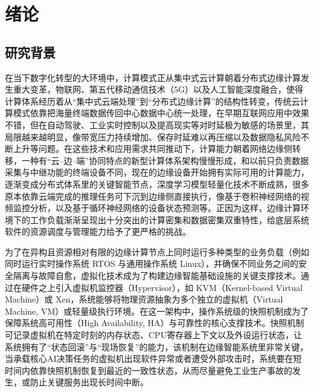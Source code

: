 

\chapter{绪论}

\section{研究背景}

在当下数字化转型的大环境中，计算模式正从集中式云计算朝着分布式边缘计算发生重大变革\cite{hamdaqa2012cloud, shi2022memory}，物联网、第五代移动通信技术（5G）以及人工智能深度融合，使得计算体系经历着从“集中式云端处理”到“分布式边缘计算”的结构性转变，传统云计算模式依靠把海量终端数据传回中心数据中心统一处理，在早期互联网应用中效果不错，但在自动驾驶、工业实时控制以及提高现实等对时延极为敏感的场景里，其局限越来越明显，像带宽压力持续增加、保存时延难以再压缩以及数据隐私风险不断上升等问题\cite{zhang2023review}。在这些技术和应用需求共同推动下，计算能力朝着网络边缘侧转移，一种有“云–边–端”协同特点的新型计算体系架构慢慢形成，和以前只负责数据采集与中继功能的终端设备不同，现在的边缘设备开始拥有实际可用的计算能力，逐渐变成分布式体系里的关键智能节点\cite{shi2022memory}，深度学习模型轻量化技术不断成熟，很多原本依靠云端完成的推理任务可下沉到边缘侧直接执行，像基于卷积神经网络的视频监控分析，以及基于循环神经网络的设备状态预测等。正因为这样，边缘计算环境下的工作负载渐渐呈现出十分突出的计算密集和数据密集双重特性，给底层系统软件的资源调度与管理能力给予了更严格的挑战。

为了在异构且资源相对有限的边缘计算节点上同时运行多种类型的业务负载（例如同时运行实时操作系统 RTOS 与通用操作系统 Linux），并确保不同业务之间的安全隔离与故障自愈，虚拟化技术成为了构建边缘智能基础设施的关键支撑技术\cite{heiser2008role, aguiar2010embedded}。通过在硬件之上引入虚拟机监控器（Hypervisor），如 KVM（Kernel-based Virtual Machine）\cite{kivity2007kvm}或 Xen\cite{barham2003xen}，系统能够将物理资源抽象为多个独立的虚拟机（Virtual Machine, VM）或轻量级执行环境。在这一架构中，操作系统级的快照机制成为了保障系统高可用性（High Availability, HA）与可靠性的核心支撑技术\cite{ta2008virtual, dunlap2002revirt}。快照机制可记录虚拟机在特定时刻的内存状态、CPU寄存器上下文以及外设运行状态，让系统拥有了“状态回滚”与“现场恢复”的能力，该机制在边缘智能系统里非常关键，当承载核心AI决策任务的虚拟机出现软件异常或者遭受外部攻击时，系统要在短时间内依靠快照机制恢复到最近的一致性状态，从而尽量避免工业生产事故的发生，或防止关键服务出现长时间中断。

